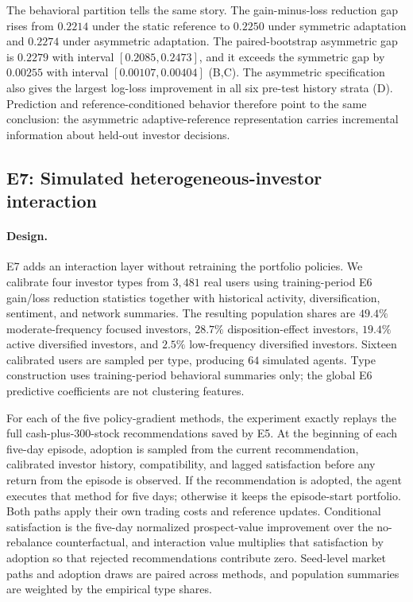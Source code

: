 The behavioral partition tells the same story.  The gain-minus-loss reduction gap rises from $0.2214$ under the static reference to $0.2250$ under symmetric adaptation and $0.2274$ under asymmetric adaptation.  The paired-bootstrap asymmetric gap is $0.2279$ with interval $[0.2085,0.2473]$, and it exceeds the symmetric gap by $0.00255$ with interval $[0.00107,0.00404]$ (B,C).  The asymmetric specification also gives the largest log-loss improvement in all six pre-test history strata (D).  Prediction and reference-conditioned behavior therefore point to the same conclusion: the asymmetric adaptive-reference representation carries incremental information about held-out investor decisions.

\subsection{E7: Simulated heterogeneous-investor interaction}\label{sec:e7}
\paragraph{Design.}
E7 adds an interaction layer without retraining the portfolio policies.  We calibrate four investor types from $3{,}481$ real users using training-period E6 gain/loss reduction statistics together with historical activity, diversification, sentiment, and network summaries.  The resulting population shares are $49.4\%$ moderate-frequency focused investors, $28.7\%$ disposition-effect investors, $19.4\%$ active diversified investors, and $2.5\%$ low-frequency diversified investors.  Sixteen calibrated users are sampled per type, producing $64$ simulated agents.  Type construction uses training-period behavioral summaries only; the global E6 predictive coefficients are not clustering features.

For each of the five policy-gradient methods, the experiment exactly replays the full cash-plus-300-stock recommendations saved by E5.  At the beginning of each five-day episode, adoption is sampled from the current recommendation, calibrated investor history, compatibility, and lagged satisfaction before any return from the episode is observed.  If the recommendation is adopted, the agent executes that method for five days; otherwise it keeps the episode-start portfolio.  Both paths apply their own trading costs and reference updates.  Conditional satisfaction is the five-day normalized prospect-value improvement over the no-rebalance counterfactual, and interaction value multiplies that satisfaction by adoption so that rejected recommendations contribute zero.  Seed-level market paths and adoption draws are paired across methods, and population summaries are weighted by the empirical type shares.

